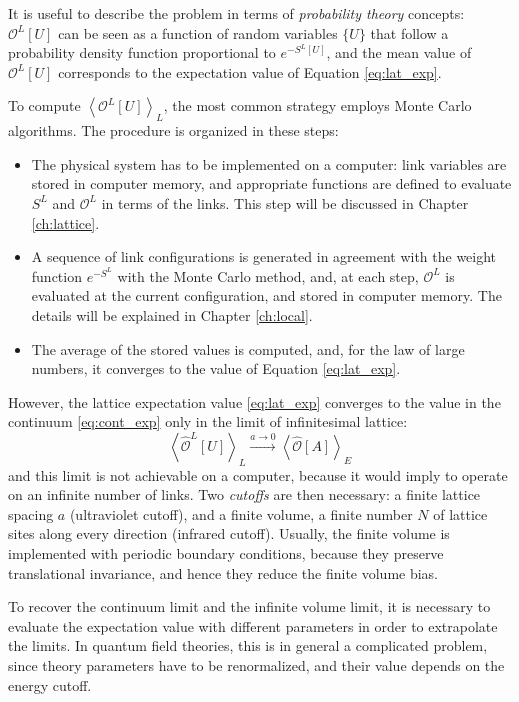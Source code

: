 It is useful to describe the problem in terms of \emph{probability theory} concepts:
$\mathcal O^L[U]$ can be seen as a function of random variables $\{U\}$ that follow a probability density function proportional to $e^{-S^L[U]}$,
and the mean value of $\mathcal O^L[U]$ corresponds to the expectation value of Equation \eqref{eq:lat_exp}.

To compute $\left<\mathcal O^L[U]\right>_L$, the most common strategy employs Monte Carlo algorithms.
The procedure is organized in these steps:
\begin{itemize}
    \item The physical system has to be implemented on a computer: link variables are stored in computer memory,
        and appropriate functions are defined to evaluate $S^L$ and $\mathcal O^L$ in terms of the links.
        This step will be discussed in Chapter \ref{ch:lattice}.
    \item A sequence of link configurations is generated in agreement with the weight function $e^{-S^L}$ with the Monte Carlo method, and, at each step,
        $\mathcal O^L$ is evaluated at the current configuration, and stored in computer memory. The details will be explained in Chapter \ref{ch:local}.
    \item The average of the stored values is computed, and, for the law of large numbers,
        it converges to the value of Equation \ref{eq:lat_exp}.
\end{itemize}

However, the lattice expectation value \eqref{eq:lat_exp} converges to the value in the continuum \eqref{eq:cont_exp} only in the limit of infinitesimal lattice:
\begin{equation}\label{eq:cont_limit}
    \left<\hat{\mathcal O}^L[U]\right>_L \xrightarrow{a\to0} \left<\hat{\mathcal O}[A]\right>_E
\end{equation}
and this limit is not achievable on a computer, because it would imply to operate on an infinite number of links.
Two \emph{cutoffs} are then necessary: a finite lattice spacing $a$ (ultraviolet cutoff),
and a finite volume, \ie a finite number $N$ of lattice sites along every direction (infrared cutoff).
Usually, the finite volume is implemented with periodic boundary conditions,
because they preserve translational invariance, and hence they reduce the finite volume bias.

To recover the continuum limit and the infinite volume limit,
it is necessary to evaluate the expectation value with different parameters in order to extrapolate the limits.
In quantum field theories, this is in general a complicated problem,
since theory parameters have to be renormalized, and their value depends on the energy cutoff.

